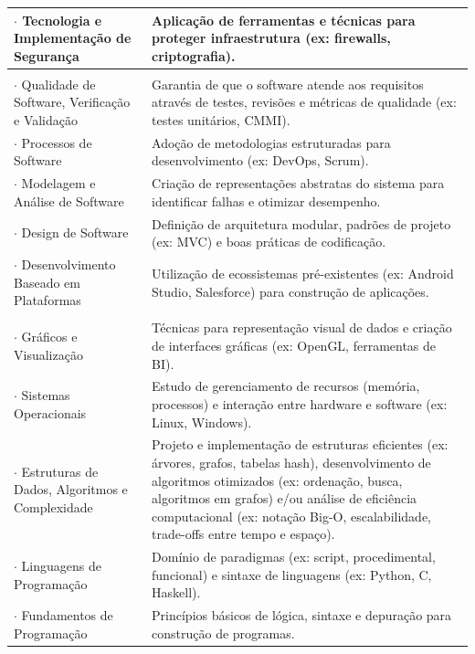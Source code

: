 \begin{table}[h]
\begin{tabular}{|m{5.5cm}|m{8.5cm}|}
    \hline
    $\cdot$ Tecnologia e Implementação de Segurança & Aplicação de ferramentas e técnicas para proteger infraestrutura (ex: firewalls, criptografia). \\
    \hline
    \rowcolor{AzulClaro} \multicolumn{2}{|l|}{\textcolor{white}{\textbf{4. Desenvolvimento de Software}}} \\
    \hline
    $\cdot$ Qualidade de Software, Verificação e Validação & Garantia de que o software atende aos requisitos através de testes, revisões e métricas de qualidade (ex: testes unitários, CMMI). \\
    \hline
    $\cdot$ Processos de Software & Adoção de metodologias estruturadas para desenvolvimento (ex: DevOps, Scrum). \\
    \hline
    $\cdot$ Modelagem e Análise de Software & Criação de representações abstratas do sistema para identificar falhas e otimizar desempenho. \\
    \hline
    $\cdot$ Design de Software & Definição de arquitetura modular, padrões de projeto (ex: MVC) e boas práticas de codificação. \\
    \hline
    $\cdot$ Desenvolvimento Baseado em Plataformas & Utilização de ecossistemas pré-existentes (ex: Android Studio, Salesforce) para construção de aplicações. \\
    \hline
    \rowcolor{AzulClaro} \multicolumn{2}{|l|}{\textcolor{white}{\textbf{5. Fundamentos de Software}}} \\
    \hline
    $\cdot$ Gráficos e Visualização & Técnicas para representação visual de dados e criação de interfaces gráficas (ex: OpenGL, ferramentas de BI). \\
    \hline
    $\cdot$ Sistemas Operacionais & Estudo de gerenciamento de recursos (memória, processos) e interação entre hardware e software (ex: Linux, Windows). \\
    \hline
    $\cdot$ Estruturas de Dados, Algoritmos e Complexidade & Projeto e implementação de estruturas eficientes (ex: árvores, grafos, tabelas hash), desenvolvimento de algoritmos otimizados (ex: ordenação, busca, algoritmos em grafos) e/ou análise de eficiência computacional (ex: notação Big-O, escalabilidade, trade-offs entre tempo e espaço). \\
    \hline
    $\cdot$ Linguagens de Programação & Domínio de paradigmas (ex: script, procedimental, funcional) e sintaxe de linguagens (ex: Python, C, Haskell). \\
    \hline
    $\cdot$ Fundamentos de Programação & Princípios básicos de lógica, sintaxe e depuração para construção de programas. \\

\end{tabular}
\end{table}

